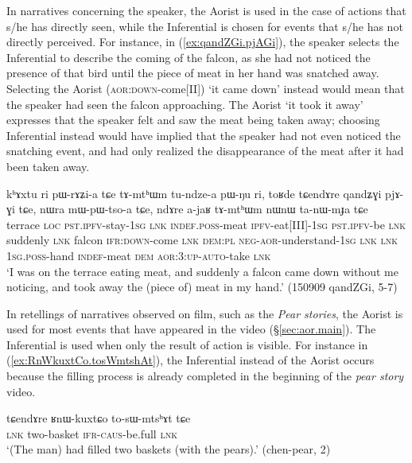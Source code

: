 In narratives concerning the speaker, the Aorist is used in the case of actions that s/he has directly seen, while the Inferential is chosen for events that s/he has not directly perceived. For instance, in (\ref{ex:qandZGi.pjAGi}), the speaker selects the Inferential  to describe the coming of the falcon, as she had not noticed the presence of that bird until the piece of meat in her hand was snatched away. Selecting the Aorist  (\textsc{aor}:\textsc{down}-come[II]) `it came down' instead would mean that the speaker had seen the falcon approaching.  The Aorist  `it took it away' expresses that the speaker felt and saw the meat being taken away; choosing  Inferential  instead would have implied that the speaker had not even noticed the snatching event, and had only realized the disappearance of the meat after it had been taken away.


\begin{exe}
\ex \label{ex:qandZGi.pjAGi}
\gll   kʰɤxtu ri pɯ-rɤʑi-a tɕe tɤ-mtʰɯm tu-ndze-a pɯ-ŋu ri, toʁde tɕendɤre qandʑɣi pjɤ-ɣi tɕe, nɯra mɯ-pɯ-tso-a tɕe, ndɤre a-jaʁ tɤ-mtʰɯm nɯnɯ ta-nɯ-mɟa tɕe \\
terrace \textsc{loc} \textsc{pst}.\textsc{ipfv}-stay-\textsc{1sg} \textsc{lnk} \textsc{indef}.\textsc{poss}-meat \textsc{ipfv}-eat[III]-\textsc{1sg} \textsc{pst}.\textsc{ipfv}-be \textsc{lnk} suddenly \textsc{lnk} falcon \textsc{ifr}:\textsc{down}-come \textsc{lnk} \textsc{dem}:\textsc{pl} \textsc{neg}-\textsc{aor}-understand-\textsc{1sg} \textsc{lnk} \textsc{lnk} \textsc{1sg}.\textsc{poss}-hand \textsc{indef}-meat \textsc{dem} \textsc{aor}:3\flobv{}:\textsc{up}-\textsc{auto}-take \textsc{lnk} \\
\glt `I was on the terrace eating meat, and suddenly a falcon came down without me noticing, and took away the (piece of) meat in my hand.' (150909 qandZGi, 5-7)
 \end{exe}



In retellings of narratives observed on film, such as the \textit{Pear stories}, the Aorist is used for most events that have appeared in the video (§\ref{sec:aor.main}). The Inferential is used when only the result of action is visible. For instance in (\ref{ex:RnWkuxtCo.tosWmtshAt}), the Inferential  instead of the Aorist  occurs because the filling process is already completed in the beginning of the \textit{pear story} video.

\begin{exe}
\ex \label{ex:RnWkuxtCo.tosWmtshAt}
\gll tɕendɤre ʁnɯ-kuxtɕo to-sɯ-mtsʰɤt tɕe \\
\textsc{lnk} two-basket \textsc{ifr}-\textsc{caus}-be.full \textsc{lnk} \\
\glt `(The man) had filled two baskets (with the pears).' (chen-pear, 2)
 \end{exe}

